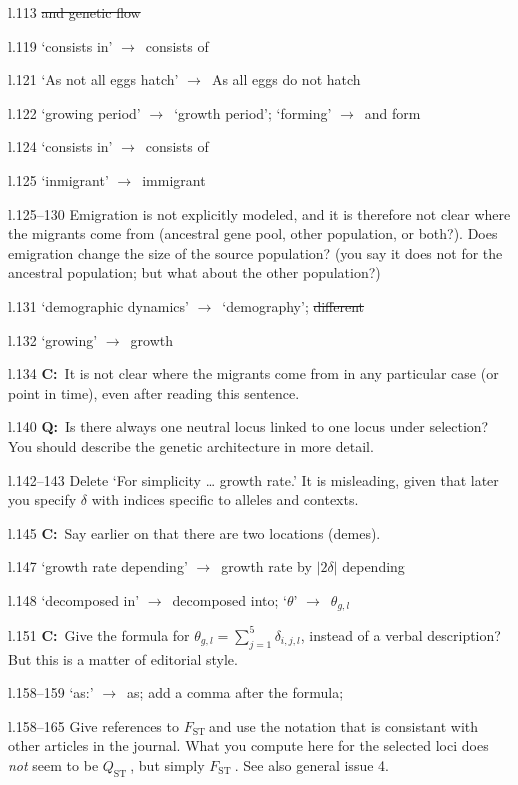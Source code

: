 \documentclass[11pt]{article}
\newenvironment{my_description}
{\begin{description}
  \setlength{\itemsep}{2pt}
  \setlength{\parskip}{0pt}
  \setlength{\parsep}{0pt}}
{\end{description}}
\newcommand{\ra}{$\rightarrow$\ }
\newcommand{\C}{\textbf{C:}\ }
\newcommand{\Q}{\textbf{Q:}\ }
\newcommand{\fst}{$F_{\mathrm{ST}}\ $}
\newcommand{\qst}{$Q_{\mathrm{ST}}\ $}
\begin{document}
\begin{my_description}
	\item[l.113] \sout{and genetic flow}
	\item[l.119] `consists in' \ra consists of
	\item[l.121] `As not all eggs hatch' \ra As all eggs do not hatch
	\item[l.122] `growing period' \ra `growth period'; `forming' \ra and form
	\item[l.124] `consists in' \ra consists of
	\item[l.125] `inmigrant' \ra immigrant
	\item[l.125--130] Emigration is not explicitly modeled, and it is therefore not clear where the migrants come from (ancestral gene pool, other population, or both?). Does emigration change the size of the source population? (you say it does not for the ancestral population; but what about the other population?)
	\item[l.131] `demographic dynamics' \ra `demography'; \sout{different}
	\item[l.132] `growing' \ra growth
	\item[l.134] \C It is not clear where the migrants come from in any particular case (or point in time), even after reading this sentence.
	\item[l.140] \Q Is there always one neutral locus linked to one locus under selection? You should describe the genetic architecture in more detail.
	\item[l.142--143] Delete `For simplicity \ldots{} growth rate.' It is misleading, given that later you specify $\delta$ with indices specific to alleles and contexts.
	\item[l.145] \C Say earlier on that there are two locations (demes).
	\item[l.147] `growth rate depending' \ra growth rate by $|2\delta|$ depending
	\item[l.148] `decomposed in' \ra decomposed into; `$\theta$' \ra $\theta_{g,l}$
	\item[l.151] \C Give the formula for $\theta_{g,l} = \sum_{j = 1}^{5}\delta_{i,j,l}$, instead of a verbal description? But this is a matter of editorial style.
	\item[l.158--159] `as:' \ra as; add a comma after the formula;
	\item[l.158--165] Give references to \fst and use the notation that is consistant with other articles in the journal. What you compute here for the selected loci does \emph{not} seem to be \qst, but simply \fst. See also general issue 4.

\end{my_description}
\end{document}
